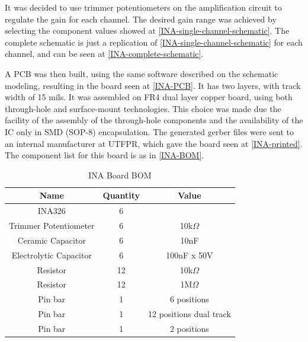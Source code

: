It was decided to use trimmer potentiometers on the amplification circuit to
regulate the gain for each channel. The desired gain range was achieved by selecting
the component values showed at \autoref{INA-single-channel-schematic}. The complete
schematic is just a replication of \autoref{INA-single-channel-schematic}
for each channel, and can be seen at \autoref{INA-complete-schematic}.

A PCB was then built, using the same software described on the schematic modeling, resulting
in the board seen at \autoref{INA-PCB}. It has two layers, with track width of 15 mils.
It was assembled on FR4 dual layer copper board, using both through-hole and
surface-mount technologies. This choice was made due the facility of the assembly
of the through-hole components and the availability of the IC only in SMD (SOP-8)
encapsulation. The generated gerber files were sent to an internal manufacturer
at UTFPR, which gave the board seen at \autoref{INA-printed}.
The component list for this board is as in \autoref{INA-BOM}.

\begin{table}[htb]
  \begin{center}
    \ABNTEXreducedfont
    \caption[INA Board BOM]{INA Board BOM}
    \label{INA-BOM}
    \begin{tabular}{c|c|c}
      \hline
      Name & Quantity & Value\\
      \hline \hline
      INA326 & 6 & \\
      Trimmer Potentiometer & 6 & 10k$\Omega$ \\
      Ceramic Capacitor & 6 & 10nF \\
      Electrolytic Capacitor & 6 & 100nF x 50V \\
      Resistor & 12 & 10k$\Omega$ \\
      Resistor & 12 & 1M$\Omega$ \\
      Pin bar & 1 & 6 positions  \\
      Pin bar & 1 & 12 positions dual track \\
      Pin bar & 1 & 2 positions \\
      \hline
    \end{tabular}
  \end{center}
\end{table}

